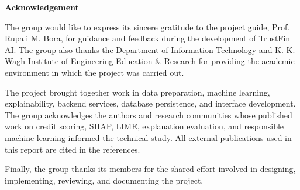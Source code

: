 \clearpage
\thispagestyle{plain}
{}
\begin{center}
{\fontsize{22}{26}\selectfont\bfseries Acknowledgement\par}
\end{center}
\vspace{0.7cm}

\noindent The group would like to express its sincere gratitude to the project guide, Prof. Rupali M. Bora, for guidance and feedback during the development of TrustFin AI. The group also thanks the Department of Information Technology and K. K. Wagh Institute of Engineering Education \& Research for providing the academic environment in which the project was carried out.

The project brought together work in data preparation, machine learning, explainability, backend services, database persistence, and interface development. The group acknowledges the authors and research communities whose published work on credit scoring, SHAP, LIME, explanation evaluation, and responsible machine learning informed the technical study. All external publications used in this report are cited in the references.

Finally, the group thanks its members for the shared effort involved in designing, implementing, reviewing, and documenting the project.

\vspace{1.3cm}
\begin{flushright}
\StudentOne\\
\StudentTwo\\
\StudentThree\\
\StudentFour
\end{flushright}
\clearpage
